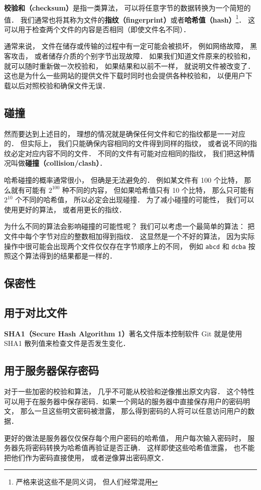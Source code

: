 
\textbf{校验和（checksum）}是指一类算法， 可以将任意字节的数据转换为一个简短的值． 我们通常也将其称为文件的\textbf{指纹（fingerprint）}或者\textbf{哈希值（hash）}\footnote{严格来说这些不是同义词， 但人们经常混用}． 这可以用于检查两个文件的内容是否相同（即使文件名不同）． %

通常来说， 文件在储存或传输的过程中有一定可能会被损坏， 例如网络故障， 黑客攻击， 或者储存介质的个别字节出现故障． 如果我们知道文件原来的校验和， 就可以随时重新做一次校验和， 如果结果和以前不一样， 就说明文件被改变了． 这也是为什么一些网站的提供文件下载时同时也会提供各种校验和， 以便用户下载以后对照校验和确保文件无误．

\subsection{碰撞}
然而要达到上述目的， 理想的情况就是确保任何文件和它的指纹都是一一对应的． 但实际上， 我们只能确保内容相同的文件得到同样的指纹， 或者说不同的指纹必定对应内容不同的文件． 不同的文件有可能对应相同的指纹， 我们把这种情况叫做\textbf{碰撞（collision/clash）}．

哈希碰撞的概率通常很小， 但确是无法避免的． 例如某文件有 100 个比特， 那么就有可能有 $2^{100}$ 种不同的内容， 但如果哈希值只有 10 个比特， 那么只可能有 $2^{10}$ 个不同的哈希值， 所以必定会出现碰撞． 为了减小碰撞的可能性， 我们可以使用更好的算法， 或者用更长的指纹．

为什么不同的算法会影响碰撞的可能性呢？ 我们可以考虑一个最简单的算法： 把文件中每个字节对应的整数相加得到指纹． 这显然是一个不好的算法， 因为实际操作中很可能会出现两个文件仅仅存在字节顺序上的不同， 例如 \verb|abcd| 和 \verb|dcba| 按照这个算法得到的结果都是一样的．

\subsection{保密性}


\subsection{用于对比文件}
\textbf{SHA1（Secure Hash Algorithm 1）}著名文件版本控制软件 Git %
就是使用 SHA1 散列值来检查文件是否发生变化．

\subsection{用于服务器保存密码}
对于一些加密的校验和算法， 几乎不可能从校验和逆像推出原文内容． 这个特性可以用于在服务器中保存密码．如果一个网站的服务器中直接保存用户的密码明文， 那么一旦这些明文密码被泄露， 那么得到密码的人将可以任意访问用户的数据．

更好的做法是服务器仅仅保存每个用户密码的哈希值， 用户每次输入密码时， 服务器先将密码转换为哈希值再验证是否正确． 这样即使这些哈希值泄露， 也不能把他们作为密码直接使用， 或者逆像算出密码原文．
